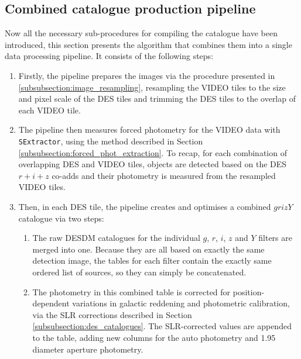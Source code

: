 \subsection{Combined \DESVIDEO catalogue production pipeline}\label{subsection:catalog_production}
Now all the necessary sub-procedures for compiling the \DESVIDEO catalogue have been introduced, this section presents the algorithm that combines them into a single data processing pipeline. It consists of the following steps: 

\begin{enumerate}
    \item Firstly, the pipeline prepares the images via the procedure presented in \ref{subsubsection:image_resampling}, resampling the VIDEO tiles to the size and pixel scale of the DES tiles and trimming the DES tiles to the overlap of each VIDEO tile. 
   
    
    \item The pipeline then measures forced photometry for the VIDEO data with \texttt{SExtractor}, using the method described in Section \ref{subsubsection:forced_phot_extraction}. To recap, for each combination of overlapping DES and VIDEO tiles, objects are detected based on the DES $r+i+z$ co-adds and their photometry is measured from the resampled VIDEO tiles.
    
    
    \item Then, in each DES tile, the pipeline creates and optimises a combined $grizY$ catalogue via two steps: 
    \begin{enumerate}
        \item The raw DESDM catalogues for the individual $g$, $r$, $i$, $z$ and $Y$ filters are merged into one. Because they are all based on exactly the same detection image, the tables for each filter contain the exactly same ordered list of sources, so they can simply be concatenated.
        \item The photometry in this combined table is corrected for position-dependent variations in galactic reddening and photometric calibration, via the SLR corrections described in Section \ref{subsubsection:des_catalogues}. The SLR-corrected values are appended to the table, adding new columns for the auto photometry and \SI{1.95}{\arcsec} diameter aperture photometry. 
    \end{enumerate}
    

\end{enumerate}
